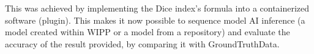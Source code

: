 This was achieved by implementing the Dice index's formula into a containerized
software (plugin). This makes it now possible to sequence model AI inference (a
model created within WIPP or a model from a repository) and evaluate the
accuracy of the result provided, by comparing it with
\Gls{GroundTruthData}.
